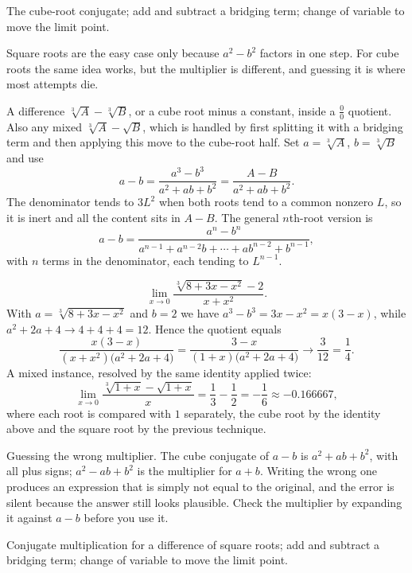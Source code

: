 \begin{seealsob}The cube-root conjugate; add and subtract a bridging term; change of variable to move the limit point.\end{seealsob}

Square roots are the easy case only because $a^{2}-b^{2}$ factors in one step. For cube roots the same idea works, but the multiplier is different, and guessing it is where most attempts die.

\cue A difference $\sqrt[3]{A}-\sqrt[3]{B}$, or a cube root minus a constant, inside a $\tfrac00$ quotient. Also any mixed $\sqrt[3]{A}-\sqrt{B}$, which is handled by first splitting it with a bridging term and then applying this move to the cube-root half.
\method Set $a=\sqrt[3]{A}$, $b=\sqrt[3]{B}$ and use
\[a-b=\frac{a^{3}-b^{3}}{a^{2}+ab+b^{2}}=\frac{A-B}{a^{2}+ab+b^{2}}.\]
The denominator tends to $3L^{2}$ when both roots tend to a common nonzero $L$, so it is inert and all the content sits in $A-B$. The general $n$th-root version is
\[a-b=\frac{a^{n}-b^{n}}{a^{n-1}+a^{n-2}b+\cdots+ab^{n-2}+b^{n-1}},\]
with $n$ terms in the denominator, each tending to $L^{n-1}$.

\begin{worked}
\[\lim_{x\to0}\frac{\sqrt[3]{8+3x-x^{2}}-2}{x+x^{2}}.\]
With $a=\sqrt[3]{8+3x-x^{2}}$ and $b=2$ we have $a^{3}-b^{3}=3x-x^{2}=x(3-x)$, while $a^{2}+2a+4\to 4+4+4=12$. Hence the quotient equals
\[\frac{x(3-x)}{(x+x^{2})\bigl(a^{2}+2a+4\bigr)}=\frac{3-x}{(1+x)\bigl(a^{2}+2a+4\bigr)}\longrightarrow\frac{3}{12}=\frac14 .\]
A mixed instance, resolved by the same identity applied twice:
\[\lim_{x\to0}\frac{\sqrt[3]{1+x}-\sqrt{1+x}}{x}=\frac13-\frac12=-\frac16\approx-0.166667,\]
where each root is compared with $1$ separately, the cube root by the identity above and the square root by the previous technique.
\end{worked}

\begin{trap}
Guessing the wrong multiplier. The cube conjugate of $a-b$ is $a^{2}+ab+b^{2}$, with all plus signs; $a^{2}-ab+b^{2}$ is the multiplier for $a+b$. Writing the wrong one produces an expression that is simply not equal to the original, and the error is silent because the answer still looks plausible. Check the multiplier by expanding it against $a-b$ before you use it.
\end{trap}

\begin{seealsob}Conjugate multiplication for a difference of square roots; add and subtract a bridging term; change of variable to move the limit point.\end{seealsob}


